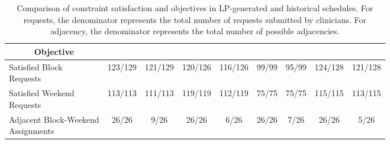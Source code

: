 \begin{table}[htbp]
\begin{adjustbox}{angle=90, scale=0.9}
\begin{tabular}{l|cc|cc|cc|cc}
			\multicolumn{1}{c|}{\textbf{Objective}}             &            &                       &            &                       &            &                       &            &                      \\ \midrule
			\makecell[l]{Satisfied Block \\ Requests}           &  123/129   &        121/129        &  120/126   &        116/126        &   99/99    &         95/99         &  124/128   &       121/128        \\
			\makecell[l]{Satisfied Weekend \\ Requests}         &  113/113   &        111/113        &  119/119   &        112/119        &   75/75    &         75/75         &  115/115   &       113/115        \\
			\makecell[l]{Adjacent Block-Weekend \\ Assignments} &   26/26    &         9/26          &   26/26    &         6/26          &   26/26    &         7/26          &   26/26    &         5/26
		\end{tabular}%
	\end{adjustbox}
	\caption{Comparison of constraint satisfaction and objectives in LP-generated and historical schedules. For requests, the denominator represents the total number of requests submitted by clinicians. For adjacency, the denominator represents the total number of possible adjacencies.}\label{tbl:constraints-comparison}%
\end{table}%
